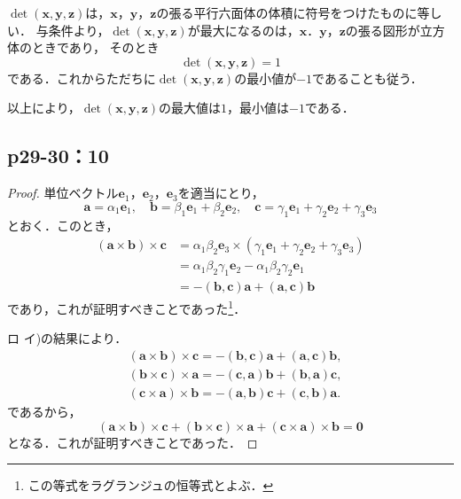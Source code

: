 \documentclass[uplatex,dvipdfmx,a4paper,10pt,fleqn]{jsarticle}
\begin{document}
\begin{tleftbar}
    $ \det (\bm{x},\bm{y},\bm{z})$は，$\bm{x}$，$\bm{y}$，$\bm{z}$の張る平行六面体の体積に符号をつけたものに等しい．
    与条件より，$\det (\bm{x},\bm{y},\bm{z})$が最大になるのは，$\bm{x}$．$\bm{y}$，$\bm{z}$の張る図形が立方体のときであり，
    そのとき
    \[
        \det (\bm{x},\bm{y},\bm{z}) =1
    \]
    である．これからただちに$\det (\bm{x},\bm{y},\bm{z})$の最小値が$-1$であることも従う．

    以上により，$\det (\bm{x},\bm{y},\bm{z})$の最大値は$1$，最小値は$-1$である．
\end{tleftbar}

\subsection*{p29-30：10}

\begin{tleftbar}
    \begin{description}
        \item[イ] 
    \begin{proof}
    単位ベクトル$\bm{e}_1$，$\bm{e}_2$，$\bm{e}_3$を適当にとり，
    \[
    \bm{a} = \alpha_1 \bm{e}_1,\quad \bm{b} = \beta_1 \bm{e}_1+\beta_2 \bm{e}_2,\quad \bm{c}= \gamma_1 \bm{e}_1 + \gamma_2 \bm{e}_2 + \gamma_3 \bm{e}_3
    \]
    とおく．このとき，
        \begin{align*}
            (\bm{a} \times \bm{b}) \times \bm{c} &= \alpha_1 \beta_2 \bm{e}_3 \times (\gamma_1 \bm{e}_1 + \gamma_2 \bm{e}_2 + \gamma_3 \bm{e}_3) \\
            & = \alpha_1 \beta_2 \gamma_1 \bm{e}_2 - \alpha_1 \beta_2 \gamma_2 \bm{e}_1 \\
            & = -(\bm{b},\bm{c})\bm{a}+(\bm{a},\bm{c}) \bm{b}
        \end{align*}
        であり，これが証明すべきことであった\footnote{この等式をラグランジュの恒等式とよぶ．}．
        \item[ロ]
        イ)の結果により．
        \begin{align*} 
                & (\bm{a}\times\bm{b}) \times \bm{c} =  -(\bm{b},\bm{c})\bm{a}+(\bm{a},\bm{c}) \bm{b} ,\\
                & (\bm{b} \times \bm{c} ) \times \bm{a} = -(\bm{c},\bm{a}) \bm{b} +(\bm{b},\bm{a}) \bm{c}, \\
                & (\bm{c} \times \bm{a} ) \times \bm{b} = -(\bm{a},\bm{b}) \bm{c} +(\bm{c},\bm{b}) \bm{a}.
        \end{align*} 
        であるから，
        \[
            (\bm{a}\times\bm{b}) \times \bm{c} + (\bm{b} \times \bm{c} ) \times \bm{a}+(\bm{c} \times \bm{a} ) \times \bm{b} =\bm{0}
        \]
        となる．これが証明すべきことであった．
    \end{proof}
\end{description}
    \end{tleftbar}
\end{document}
